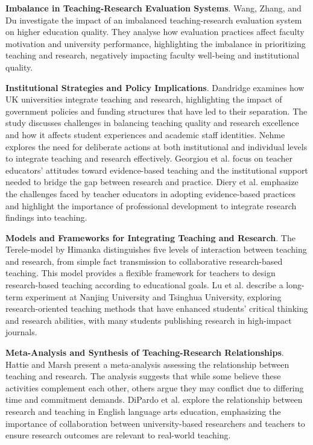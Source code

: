 \documentclass[conference]{IEEEtran}
\begin{document}
\textbf{Imbalance in Teaching-Research Evaluation Systems}. Wang, Zhang, and Du \cite{wang2023impact} investigate the impact of an imbalanced teaching-research evaluation system on higher education quality. They analyse how evaluation practices affect faculty motivation and university performance, highlighting the imbalance in prioritizing teaching and research, negatively impacting faculty well-being and institutional quality.  

\textbf{Institutional Strategies and Policy Implications}. Dandridge \cite{dandridge2023relationship} examines how UK universities integrate teaching and research, highlighting the impact of government policies and funding structures that have led to their separation. The study discusses challenges in balancing teaching quality and research excellence and how it affects student experiences and academic staff identities. Nehme \cite{nehme2022nexus} explores the need for deliberate actions at both institutional and individual levels to integrate teaching and research effectively. Georgiou et al. \cite{georgiou2023turning} focus on teacher educators' attitudes toward evidence-based teaching and the institutional support needed to bridge the gap between research and practice. Diery et al. \cite{diery2020evidence} emphasize the challenges faced by teacher educators in adopting evidence-based practices and highlight the importance of professional development to integrate research findings into teaching.  

\textbf{Models and Frameworks for Integrating Teaching and Research}. The Terele-model by Himanka \cite{Himanka2024} distinguishes five levels of interaction between teaching and research, from simple fact transmission to collaborative research-based teaching. This model provides a flexible framework for teachers to design research-based teaching according to educational goals. Lu et al. \cite{lu2008experiment} describe a long-term experiment at Nanjing University and Tsinghua University, exploring research-oriented teaching methods that have enhanced students' critical thinking and research abilities, with many students publishing research in high-impact journals.  

\textbf{Meta-Analysis and Synthesis of Teaching-Research Relationships}. Hattie and Marsh \cite{hattie1996relationship} present a meta-analysis assessing the relationship between teaching and research. The analysis suggests that while some believe these activities complement each other, others argue they may conflict due to differing time and commitment demands. DiPardo et al. \cite{DiPardo2006} explore the relationship between research and teaching in English language arts education, emphasizing the importance of collaboration between university-based researchers and teachers to ensure research outcomes are relevant to real-world teaching.  
\end{document}
